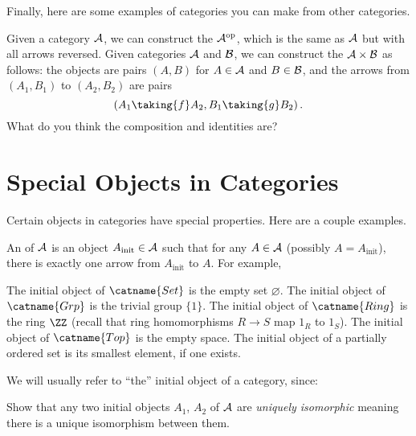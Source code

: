 Finally, here are some examples of categories you can make from other categories.
\begin{example}
	\listhack
	\begin{enumerate}[(a)]
		\ii Given a category $\AA$, we can construct the 
		$\AA\op$, which is the same as $\AA$ but with all arrows reversed.
		\ii Given categories $\AA$ and $\BB$, we can construct the  $\AA \times \BB$
		as follows: the objects are pairs $(A, B)$ for $A \in \AA$ and $B \in \BB$,
		and the arrows from $(A_1, B_1)$ to $(A_2, B_2)$
		are pairs \[ \left( A_1 \taking{f} A_2, B_1 \taking{g} B_2 \right). \]
		What do you think the composition and identities are?
	\end{enumerate}
\end{example}

\section{Special Objects in Categories}
Certain objects in categories have special properties.
Here are a couple examples.
\begin{example}
	An  of $\AA$ is an object
	$A_{\text{init}} \in \AA$ such that for any $A \in \AA$ (possibly $A = A_{\text{init}}$),
	there is exactly one arrow from $A_{\text{init}}$ to $A$.
	For example,
	\begin{enumerate}[(a)]
		\ii The initial object of $\catname{Set}$ is the empty set $\varnothing$.
		\ii The initial object of $\catname{Grp}$ is the trivial group $\{1\}$.
		\ii The initial object of $\catname{Ring}$ is the ring $\ZZ$
		(recall that ring homomorphisms $R \to S$ map $1_R$ to $1_S$).
		\ii The initial object of $\catname{Top}$ is the empty space.
		\ii The initial object of a partially ordered set is its smallest element, if one exists.
	\end{enumerate}
\end{example}

We will usually refer to ``the'' initial object of a category, since:
\begin{exercise}
	[Important!]
	Show that any two initial objects $A_1$, $A_2$ of $\AA$ are \emph{uniquely isomorphic}
	meaning there is a unique isomorphism between them.
\end{exercise}

